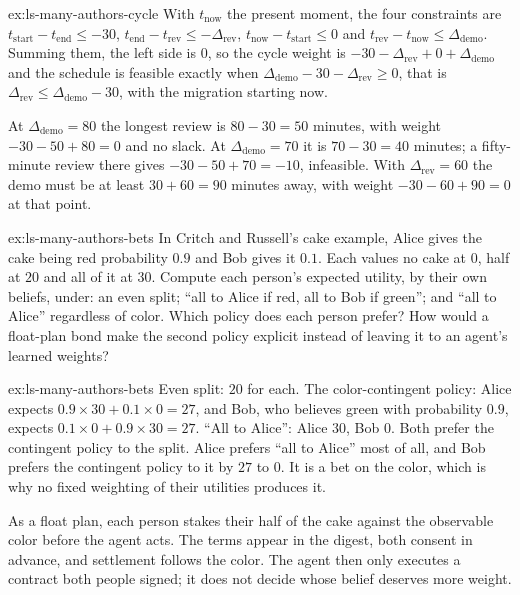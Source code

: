\begin{pdsolution}{ex:ls-many-authors-cycle}
With $t_{\mathrm{now}}$ the present moment, the four constraints are $t_{\mathrm{start}}-t_{\mathrm{end}}\le-30$, $t_{\mathrm{end}}-t_{\mathrm{rev}}\le-\Delta_{\mathrm{rev}}$,
$t_{\mathrm{now}}-t_{\mathrm{start}}\le0$ and $t_{\mathrm{rev}}-t_{\mathrm{now}}\le \Delta_{\mathrm{demo}}$. Summing them, the left side is $0$, so the cycle
weight is $-30-\Delta_{\mathrm{rev}}+0+\Delta_{\mathrm{demo}}$ and the schedule is feasible exactly when $\Delta_{\mathrm{demo}}-30-\Delta_{\mathrm{rev}}\ge0$,
that is $\Delta_{\mathrm{rev}}\le \Delta_{\mathrm{demo}}-30$, with the migration starting now.

At $\Delta_{\mathrm{demo}}=80$ the longest review is $80-30=50$ minutes, with weight
$-30-50+80=0$ and no slack. At $\Delta_{\mathrm{demo}}=70$ it is $70-30=40$ minutes; a fifty-minute
review there gives $-30-50+70=-10$, infeasible. With $\Delta_{\mathrm{rev}}=60$ the demo must be
at least $30+60=90$ minutes away, with weight $-30-60+90=0$ at that point.
\end{pdsolution}
\begin{pdexercise}[kind=Trace,rating=2]{ex:ls-many-authors-bets}
In Critch and Russell's cake example, Alice gives the cake being red
probability $0.9$ and Bob gives it $0.1$. Each values no cake at $0$, half at
$20$ and all of it at $30$. Compute each person's expected utility, by their
own beliefs, under: an even split; ``all to Alice if red, all to Bob if
green''; and ``all to Alice'' regardless of color. Which policy does each
person prefer? How would a float-plan bond make the second policy explicit
instead of leaving it to an agent's learned weights?
\end{pdexercise}
\begin{pdsolution}{ex:ls-many-authors-bets}
Even split: $20$ for each. The color-contingent policy: Alice expects
$0.9\times30+0.1\times0=27$, and Bob, who believes green with probability
$0.9$, expects $0.1\times0+0.9\times30=27$. ``All to Alice'': Alice $30$,
Bob $0$. Both prefer the contingent policy to the split. Alice prefers ``all
to Alice'' most of all, and Bob prefers the contingent policy to it by $27$ to
$0$. It is a bet on the color, which is why no
fixed weighting of their utilities produces it.

As a float plan, each person stakes their half of the cake against the
observable color before the agent acts. The terms appear in the digest, both
consent in advance, and settlement follows the color. The agent then only
executes a contract both people signed; it does not decide whose belief
deserves more weight.
\end{pdsolution}
